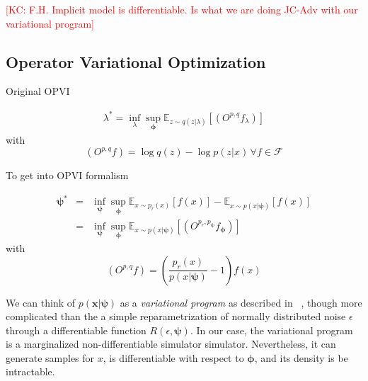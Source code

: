 \documentclass[twocolumn,superscriptaddress,aps]{revtex4-1}
\newcommand{\kcnote}[1]{\textcolor{red}{[KC: #1]}}
\newcommand{\bftheta}{{\bm \theta}}
\newcommand{\bfpsi}{{\bm \psi}}
\newcommand{\bfphi}{{\bm \phi}}
\newcommand{\bfx}{\mathbf{x}}
\theoremstyle{plain}
\begin{document}
\kcnote{F.H. Implicit model is differentiable. Is what we are doing JC-Adv with our variational program}

\subsection{Operator Variational Optimization}

Original OPVI  \citep{2016arXiv161009033R}

\begin{eqnarray}
\lambda^* = \inf_\lambda \sup_\bfphi \mathbb{E}_{ z \sim q( z | \lambda)} [ (O^{p,q} f_\lambda) ] 
\end{eqnarray}
with
\begin{equation}
(O^{p,q} f) = \log q(z) - \log p(z|x) \, \forall f \in \mathcal{F}
\end{equation}


%

To get into OPVI formalism

\begin{eqnarray}
\bfpsi^* &=& \inf_\bfpsi \sup_\bfphi\mathbb{E}_{x\sim p_r(x)}[f(x)] - \mathbb{E}_{x \sim p(x|\bfpsi)}[f(x)] \\
&=&  \inf_\bfpsi \sup_\bfphi \mathbb{E}_{ x \sim p( x | \bfpsi)} [ (O^{p_r,p_\bfpsi} f_\bfphi) ] 
\end{eqnarray}
with
\begin{equation}
(O^{p,q} f) = \left( \frac{p_r(x)}{p(x|\bfpsi)}  -1 \right) f(x)
\end{equation}

We can think of $p(\bfx|\bfpsi)$ as a \textit{variational program} as described in ~\citep{2016arXiv161009033R}, though more complicated than the a simple reparametrization of normally distributed noise $\epsilon$ through a differentiable function $R(\epsilon, \bfpsi)$. In our case, the variational program is a marginalized non-differentiable simulator simulator.  Nevertheless, it can generate samples for $x$, is differentiable with respect to $\bfphi$, and its density is be intractable.
\end{document}
